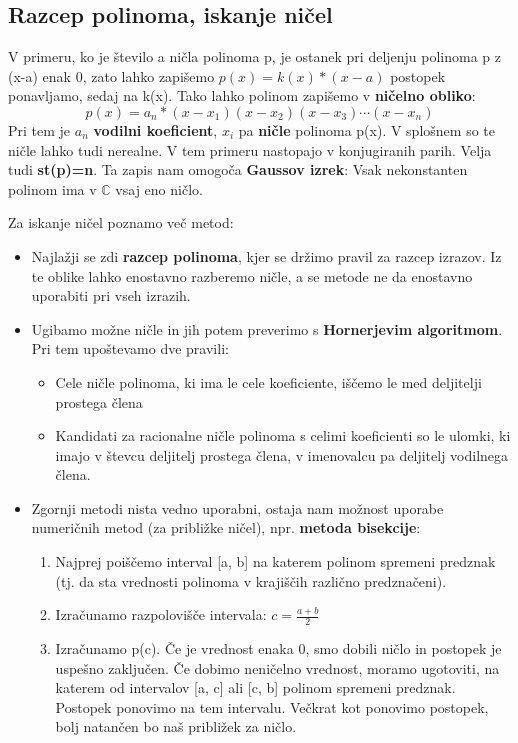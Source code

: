 \subsection{Razcep polinoma, iskanje ničel}
V primeru, ko je število a ničla polinoma p, je ostanek pri deljenju polinoma p z (x-a) enak 0, zato lahko zapišemo $p(x)= k(x)*(x-a)$ postopek ponavljamo, sedaj na k(x). Tako lahko polinom zapišemo v \textbf{ničelno obliko}: 
\[
p(x)= a_n*(x-x_1)(x-x_2)(x-x_3)\cdots(x-x_n)
\]
Pri tem je $a_n$ \textbf{vodilni koeficient}, $x_i$ pa \textbf{ničle} polinoma p(x). V splošnem so te ničle lahko tudi nerealne. V tem primeru nastopajo v konjugiranih parih. Velja tudi \textbf{st(p)=n}. Ta zapis nam omogoča \textbf{Gaussov izrek}: Vsak nekonstanten polinom ima v $\mathbb{C}$ vsaj eno ničlo.

Za iskanje ničel poznamo več metod:
\begin{itemize}
\item Najlažji se zdi \textbf{razcep polinoma}, kjer se držimo pravil za razcep izrazov. Iz te oblike lahko enostavno razberemo ničle, a se metode ne da enostavno uporabiti pri vseh izrazih.
\item Ugibamo možne ničle in jih potem preverimo s \textbf{Hornerjevim algoritmom}. Pri tem upoštevamo dve pravili: 
\begin{itemize}
\item Cele ničle polinoma, ki ima le cele koeficiente, iščemo le med deljitelji prostega člena 
\item Kandidati za racionalne ničle polinoma s celimi koeficienti so le ulomki, ki imajo v števcu deljitelj prostega člena, v imenovalcu pa deljitelj vodilnega člena.
\end{itemize}
\item Zgornji metodi nista vedno uporabni, ostaja nam možnost uporabe numeričnih metod (za približke ničel), npr. \textbf{metoda bisekcije}:\begin{enumerate}
\item Najprej poiščemo interval [a, b] na katerem polinom spremeni predznak (tj. da sta vrednosti polinoma v krajiščih različno predznačeni).
\item Izračunamo razpolovišče intervala: $c=\frac{a+b}{2}$
\item Izračunamo p(c). Če je vrednost enaka 0, smo dobili ničlo in postopek je uspešno zaključen. Če dobimo neničelno vrednost, moramo ugotoviti, na katerem od intervalov [a, c] ali [c, b] polinom spremeni predznak. Postopek ponovimo na tem intervalu. Večkrat kot ponovimo postopek, bolj natančen bo naš približek za ničlo. 
\end{enumerate}
\end{itemize}

